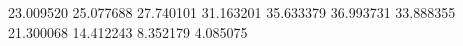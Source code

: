 23.009520
25.077688
27.740101
31.163201
35.633379
36.993731
33.888355
21.300068
14.412243
8.352179
4.085075
